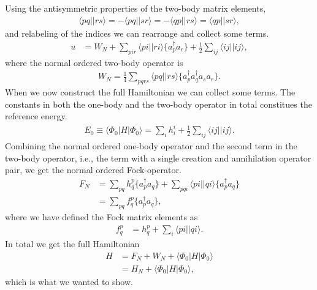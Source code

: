 \documentclass[
    a4paper, aps, twocolumn, floatfix, superscriptaddress,
    nofootinbib]{revtex4-1}
\newcommand{\1}{\mathds{1}}
\newcommand{\half}{\frac{1}{2}}
\newcommand{\bra}[1]{\langle #1\lvert}
\newcommand{\ket}[1]{\rvert #1\rangle}
\newcommand{\acr}[1]{a_{#1}^{\dagger}}
\newcommand{\ade}[1]{a_{#1}}
\newcommand{\kslat}{\ket{\Phi_0}}
\newcommand{\bslat}{\bra{\Phi_0}}
\begin{document}
    Using the antisymmetric properties of the two-body matrix elements,
    \begin{align}
        \bra{pq}\ket{rs}
        = - \bra{pq}\ket{sr}
        = - \bra{qp}\ket{rs}
        = \bra{qp}\ket{sr},
    \end{align}
    and relabeling of the indices we can rearrange and collect some terms.
    \begin{align}
        u
        &=
        W_N + \sum_{pir}\bra{pi}\ket{ri}\{\acr{p}\ade{r}\}
        + \half\sum_{ij}\bra{ij}\ket{ij},
    \end{align}
    where the normal ordered two-body operator is
    \begin{align}
        W_N = \frac{1}{4}\sum_{pqrs}
        \bra{pq}\ket{rs}\{\acr{p}\acr{q}\ade{s}\ade{r}\}.
    \end{align}
    When we now construct the full Hamiltonian we can collect some terms. The
    constants in both the one-body and the two-body operator in total constitues
    the reference energy.
    \begin{align}
        E_0 \equiv \bslat H\kslat
        = \sum_{i}h_i^i + \frac{1}{2}\sum_{ij}\bra{ij}\ket{ij}.
        \label{eq:reference_energy}
    \end{align}
    Combining the normal ordered one-body operator and the second term in the
    two-body operator, i.e., the term with a single creation and annihilation
    operator pair, we get the normal ordered Fock-operator.
    \begin{align}
        F_N
        &=
        \sum_{pq}h_{q}^{p}\{\acr{p}\ade{q}\}
        + \sum_{pqi}\bra{pi}\ket{qi}\{\acr{p}\ade{q}\}
        \\
        &= \sum_{pq}f_{q}^{p}\{\acr{p}\ade{q}\},
    \end{align}
    where we have defined the Fock matrix elements as
    \begin{align}
        f_{q}^{p}
        &=
        h_q^p + \sum_{i}\bra{pi}\ket{qi}.
    \end{align}
    In total we get the full Hamiltonian
    \begin{align}
        H
        &=
        F_N + W_N + \bslat H\kslat
        \\
        &= H_N + \bslat H\kslat,
    \end{align}
    which is what we wanted to show.\cite{crawford2007introduction}
\end{document}
